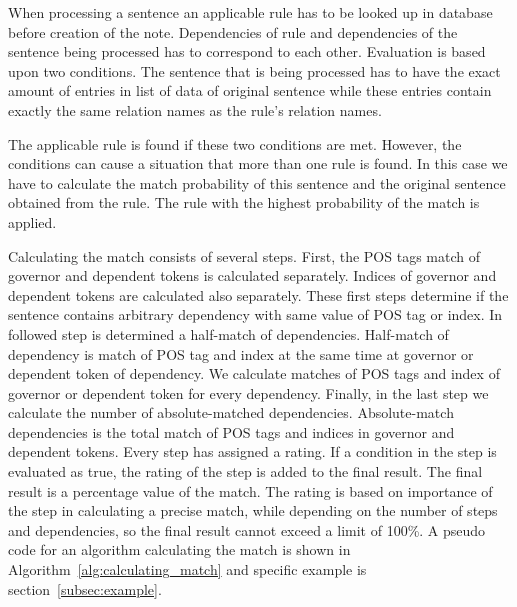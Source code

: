 \documentclass{iitsrc}
\begin{document}
		When processing a sentence an applicable rule has to be looked up in database before creation of the note. Dependencies of rule and dependencies of the sentence being processed has to correspond to each other. Evaluation is based upon two conditions. The sentence that is being processed has to have the exact amount of entries in list of data of original sentence while these entries contain exactly the same relation names as the rule's relation names.
			
		The applicable rule is found if these two conditions are met. However, the conditions can cause a situation that more than one rule is found. In this case we have to calculate the match probability of this sentence and the original sentence obtained from the rule. The rule with the highest probability of the match is applied.
			
		Calculating the match consists of several steps. First, the POS tags match of governor and dependent tokens is calculated separately. Indices of governor and dependent tokens are calculated also separately. These first steps determine if the sentence contains arbitrary dependency with same value of POS tag or index. In followed step is determined a half-match of dependencies. Half-match of dependency is match of POS tag and index at the same time at governor or dependent token of dependency. We calculate matches of POS tags and index of governor or dependent token for every dependency. Finally, in the last step we calculate the number of absolute-matched dependencies. Absolute-match dependencies is the total match of POS tags and indices in governor and dependent tokens. Every step has assigned a rating. If a condition in the step is evaluated as true, the rating of the step is added to the final result. The final result is a percentage value of the match. The rating is based on importance of the step in calculating a precise match, while depending on the number of steps and dependencies, so the final result cannot exceed a limit of 100\%. A pseudo code for an algorithm calculating the match is shown in Algorithm~\ref{alg:calculating_match} and specific example is section~\ref{subsec:example}.  \\
			
\end{document}
